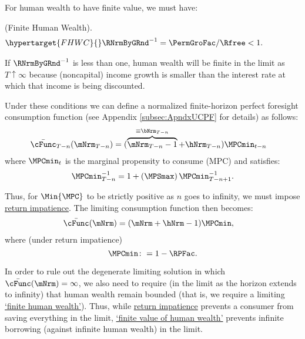 \documentclass[BufferStockTheory]{subfiles}
\begin{document}
For human wealth to have finite value, we must have:
%
\begin{assumI}\label{ass:FHWC}(Finite Human Wealth).
\begin{align}\hypertarget{FHWC}{}
   \RNrmByGRnd^{-1} = \PermGroFac/\Rfree  & < 1. \phantom{\text{{\FHWC}:~~}}\label{eq:FHWC2}
\end{align}
\end{assumI}
%
If $\RNrmByGRnd^{-1}$ is less than one, human wealth will be finite in the limit as $T \uparrow \infty$ because (noncapital) income growth is smaller than the interest rate at which that income is being discounted.

Under these conditions we can define a normalized finite-horizon perfect foresight consumption function (see Appendix \ref{subsec:ApndxUCPF} for details) as follows:\hypertarget{MPCminDefn}{}
%
%
\begin{align*}
  \bar{\cFunc}_{T-n}(\mNrm_{T-n})  & = (\overbrace{\mNrm_{T-n}-1}^{
                                     \equiv\bNrm_{T-n}}+\hNrm_{T-n})\MPCmin_{t-n}
\end{align*}
%
where $\MPCmin_{t}$ is the marginal propensity to consume (MPC) and satisfies:
%
\begin{align}\label{eq:PFMPCminInv}
\MPCmin_{T-n}^{-1}  = 1+\left(\MPSmax\right) \MPCmin_{T-n+1}^{-1}.
\end{align}
%

Thus, for $\Min{\MPC}$ to be strictly positive as $n$ goes to infinity, we must impose \hyperlink{RIC}{return impatience}.
The limiting consumption function then becomes:
%
%
\begin{align}\label{eq:cFuncPFUnc}
  \bar{\cFunc}(\mNrm)  & = (\mNrm+\hNrm-1)\MPCmin,
\end{align}
%
where (under return impatience) 
%
%
\begin{equation}\label{eq:MPCminDef}
\MPCmin \colon = 1-\RPFac.
\end{equation}
%
%
%

In order to rule out the degenerate limiting solution in which $\bar{\cFunc}(\mNrm) = \infty$, we also need to require (in the limit as the horizon extends to infinity) that human wealth remain bounded (that is, we require a limiting \hyperlink{FHWC}{`finite human wealth'}).
Thus, while \hyperlink{RIC}{return impatience} prevents a consumer from saving everything in the limit,  \hyperlink{FHWC}{`finite value of human wealth'} prevents infinite borrowing (against infinite human wealth) in the limit.
\end{document}
